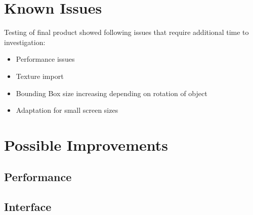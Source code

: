 \documentclass[12pt]{article}
\begin{document}
\newpage
\section{Known Issues}
Testing of final product showed following issues that require additional time to investigation:
\begin{itemize}
\item Performance issues
\item Texture import
\item Bounding Box size increasing depending on rotation of object
\item Adaptation for small screen sizes
\end{itemize}

\newpage
\section{Possible Improvements}
\subsection{Performance}
\subsection{Interface}


\newpage


\end{document}
